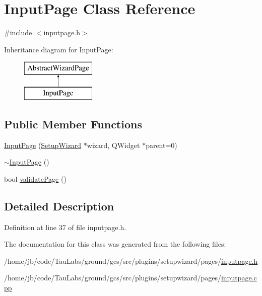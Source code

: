 \hypertarget{class_input_page}{\section{\-Input\-Page \-Class \-Reference}
\label{class_input_page}
}


{\ttfamily \#include $<$inputpage.\-h$>$}

\-Inheritance diagram for \-Input\-Page\-:\begin{figure}[H]
\begin{center}
\leavevmode
\includegraphics[height=2.000000cm]{class_input_page}
\end{center}
\end{figure}
\subsection*{\-Public \-Member \-Functions}
\begin{DoxyCompactItemize}
\item 
\hyperlink{group___input_page_ga1235bc645b12e53fe8cb3809353b7cfd}{\-Input\-Page} (\hyperlink{class_setup_wizard}{\-Setup\-Wizard} $\ast$wizard, \-Q\-Widget $\ast$parent=0)
\item 
\hyperlink{group___input_page_ga914e0c684267a45005618f8cc8f30fc5}{$\sim$\-Input\-Page} ()
\item 
bool \hyperlink{group___input_page_ga1bd59263f2a4bfb96d7ed395c118266d}{validate\-Page} ()
\end{DoxyCompactItemize}


\subsection{\-Detailed \-Description}


\-Definition at line 37 of file inputpage.\-h.



\-The documentation for this class was generated from the following files\-:\begin{DoxyCompactItemize}
\item 
/home/jb/code/\-Tau\-Labs/ground/gcs/src/plugins/setupwizard/pages/\hyperlink{inputpage_8h}{inputpage.\-h}\item 
/home/jb/code/\-Tau\-Labs/ground/gcs/src/plugins/setupwizard/pages/\hyperlink{inputpage_8cpp}{inputpage.\-cpp}\end{DoxyCompactItemize}

